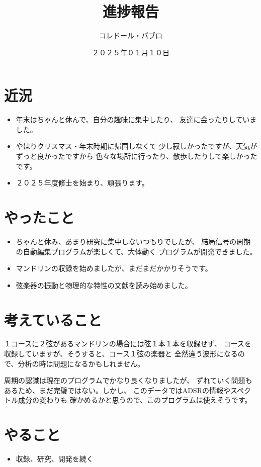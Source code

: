 \documentclass[a4paper, 12pt]{article}
\title{進捗報告}
\author{コレドール・パブロ}
\date{２０２５年０１月１０日}
\begin{document}
\maketitle

\section*{近況}
\begin{itemize}
    \item 年末はちゃんと休んで、自分の趣味に集中したり、
    友達に会ったりしていました。
    \item やはりクリスマス・年末時期に帰国しなくて
    少し寂しかったですが、天気がずっと良かったですから
    色々な場所に行ったり、散歩したりして楽しかったです。
    \item ２０２５年度修士を始まり、頑張ります。
\end{itemize} 

\section*{やったこと}
\begin{itemize}
    \item ちゃんと休み、あまり研究に集中しないつもりでしたが、
    結局信号の周期の自動編集プログラムが楽しくて、大体動く
    プログラムが開発できました。
    \item マンドリンの収録を始めましたが、まだまだかかりそうです。
    \item 弦楽器の振動と物理的な特性の文献を読み始めました。\cite{String_vibration}
\end{itemize}

\section*{考えていること}

１コースに２弦があるマンドリンの場合には弦１本１本を収録せず、
コースを収録していますが、そうすると、コース１弦の楽器と
全然違う波形になるので、分析の時は問題になるかもしれません。

周期の認識は現在のプログラムでかなり良くなりましたが、
ずれていく問題もあるため、まだ完璧ではない。しかし、
このデータではADSRの情報やスペクトル成分の変わりも
確かめるかと思うので、このプログラムは使えそうです。

\section*{やること}
\begin{itemize}
    \item 収録、研究、開発を続く
\end{itemize}



\end{document}
